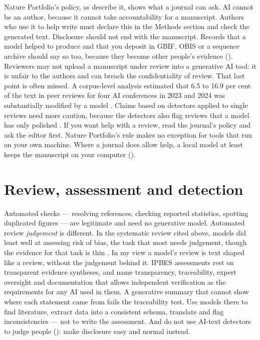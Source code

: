Nature Portfolio's policy, as \textcite{naturemethods2026responsibly} describe
it, shows what a journal can ask. AI cannot be an author, because it cannot take
accountability for a manuscript. Authors who use it to help write must declare
this in the Methods section and check the generated text. Disclosure should not
end with the manuscript. Records that a model helped to produce and that you
deposit in GBIF, OBIS or a sequence archive should say so too, because they
become other people's evidence (). Reviewers may not
upload a manuscript under review into a generative AI tool: it is unfair to the
authors and can breach the confidentiality of review. That last point is often
missed. A corpus-level analysis estimated that 6.5 to 16.9
per cent of the text in peer reviews for four AI conferences in 2023 and 2024
was substantially modified by a model \parencite{liang2024peerreview}. Claims
based on detectors applied to single reviews need more caution, because the
detectors also flag reviews that a model has only polished
\parencite{saha2026peerreview}. If you want help with a review, read the
journal's policy and ask the editor first. Nature Portfolio's rule makes no
exception for tools that run on your own machine. Where a journal does allow
help, a local model at least keeps the manuscript on your computer
().

\section{Review, assessment and detection}

Automated checks --- resolving references, checking reported statistics,
spotting duplicated figures --- are legitimate and need no generative model.
Automated review \emph{judgement} is different. In the systematic review cited
above, models did least well at assessing risk of bias, the task that most
needs judgement, though the evidence for that task is thin
\parencite{laignelot2026systematicreviews}. In my view a model's review is
text shaped like a review, without the judgement behind it. IPBES assessments
rest on transparent evidence syntheses, and \textcite{krug2026ipbes} name
transparency, traceability, expert oversight and documentation that allows
independent verification as the requirements for any AI used in them. A
generative summary that cannot show where each statement came from fails the
traceability test. Use models there to find literature, extract data into a
consistent schema, translate and flag inconsistencies --- not to write the assessment. And
do not use AI-text detectors to judge people (): make
disclosure easy and normal instead.
